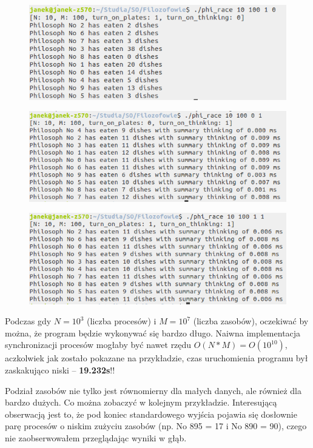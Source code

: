 \documentclass{article}
\begin{document}
\begin{figure}[h!]
\centering
\includegraphics[scale=0.4]{test_10_100_1_0.png}
\end{figure} 

\begin{figure}[h!]
\centering
\includegraphics[scale=0.4]{test_10_100_0_1.png}
\end{figure} 

\begin{figure}[h!]
\centering
\includegraphics[scale=0.4]{test_10_100_1_1.png}
\end{figure} 

\newpage
Podczas gdy \textbf{$N = 10^3$} (liczba procesów) i \textbf{$M = 10^7$} (liczba zasobów), oczekiwać by można, że program będzie wykonywać się bardzo długo. Naiwna implementacja synchronizacji procesów mogłaby być nawet rzędu \textbf{$O(N*M) = O(10^{10})$}, aczkolwiek jak zostało pokazane na przykładzie, czas uruchomienia programu był zaskakująco niski -- \textbf{19.232s}!! 

Podział zasobów nie tylko jest równomierny dla małych danych, ale również dla bardzo dużych. Co można zobaczyć w kolejnym przykładzie. Interesującą obserwacją jest to, że pod koniec standardowego wyjścia pojawia się dosłownie parę procesów o niskim zużyciu zasobów (np. No 895 = 17 i No 890 = 90), czego nie zaobserwowałem przeglądając wyniki w głąb. 
\end{document}
